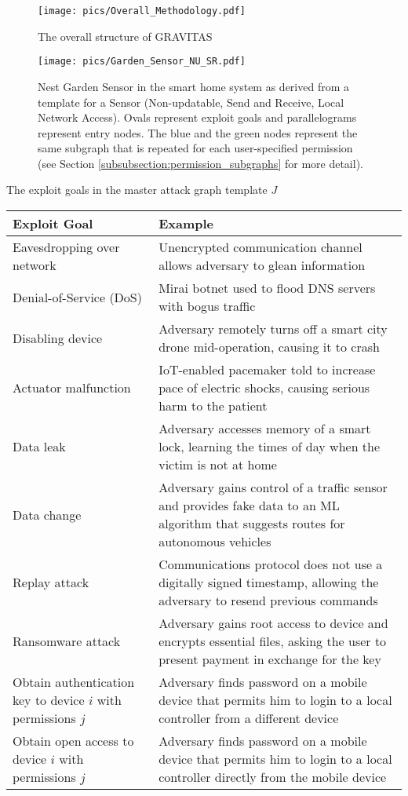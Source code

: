 \documentclass[10pt,journal,compsoc]{IEEEtran}
\begin{document}
\begin{figure}[h!]
\centerline{\texttt{[image: pics/Overall\_Methodology.pdf]}}
\caption{The overall structure of GRAVITAS}
\label{fig:overall_structure}
\end{figure}


\begin{figure*}[t!]
\centering
\texttt{[image: pics/Garden\_Sensor\_NU\_SR.pdf]}
\captionsetup{justification=raggedright, singlelinecheck=false}
\caption{Nest Garden Sensor in the smart home system as derived from a template for a Sensor (Non-updatable, Send and Receive, Local Network Access). Ovals represent exploit goals and parallelograms represent entry nodes. The blue and the green nodes represent the same subgraph that is repeated for each user-specified permission (see Section \ref{subsubsection:permission_subgraphs} for more detail).}
\label{fig:sensor_smarthome}
\end{figure*}


\begin {table*}[h!]
\caption {The exploit goals in the master attack graph template $J$}
\begin{tabular}{|m{4cm}|m{13cm}|}
\hline
\textbf{Exploit Goal} & \textbf{Example} \\ \hline
Eavesdropping over network & Unencrypted communication channel allows adversary to glean information \\ \hline
Denial-of-Service (DoS) & Mirai botnet used to flood DNS servers with bogus traffic \\ \hline
Disabling device & Adversary remotely turns off a smart city drone mid-operation, causing it to crash \\ \hline
Actuator malfunction & IoT-enabled pacemaker told to increase pace of electric shocks, causing serious harm to the patient \\ \hline
Data leak & Adversary accesses memory of a smart lock, learning the times of day when the victim is not at home \\ \hline
Data change & Adversary gains control of a traffic sensor and provides fake data to an ML algorithm that suggests routes for autonomous vehicles \\ \hline
Replay attack & Communications protocol does not use a digitally signed timestamp, allowing the adversary to resend previous commands \\ \hline
Ransomware attack & Adversary gains root access to device and encrypts essential files, asking the user to present payment in exchange for the key \\ \hline
Obtain authentication key to device $i$ with permissions $j$ & Adversary finds password on a
mobile device that permits him to login to a local controller from a different device \\ \hline
Obtain open access to device $i$ with permissions $j$ & Adversary finds password on a mobile
device that permits him to login to a local controller directly from the mobile device \\
\hline
\end{tabular}
\label{table:attack_outcomes}		
\end {table*}
\end{document}
